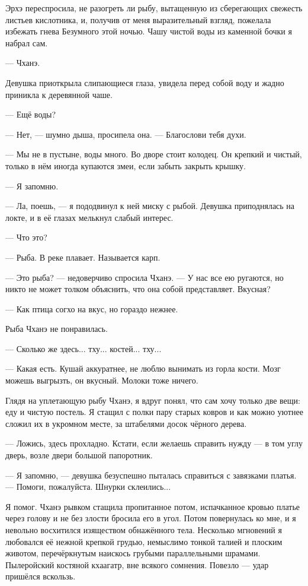 Эрхэ переспросила, не разогреть ли рыбу, вытащенную из сберегающих свежесть листьев кислотника, и, получив от меня выразительный взгляд, пожелала избежать гнева Безумного этой ночью.
Чашу чистой воды из каменной бочки я набрал сам.

--- Чханэ.

Девушка приоткрыла слипающиеся глаза, увидела перед собой воду и жадно приникла к деревянной чаше.

--- Ещё воды?

--- Нет, --- шумно дыша, просипела она.
--- Благослови тебя духи.

--- Мы не в пустыне, воды много.
Во дворе стоит колодец.
Он крепкий и чистый, только в нём иногда купаются змеи, если забыть закрыть крышку.

--- Я запомню.

--- Ла, поешь, --- я пододвинул к ней миску с рыбой.
Девушка приподнялась на локте, и в её глазах мелькнул слабый интерес.

--- Что это?

--- Рыба.
В реке плавает.
Называется карп.

--- Это рыба? --- недоверчиво спросила Чханэ.
--- У нас все ею ругаются, но никто не может толком объяснить, что она собой представляет.
Вкусная?

--- Как птица согхо на вкус, но гораздо нежнее.

Рыба Чханэ не понравилась.

--- Сколько же здесь... тху... костей... тху...

--- Какая есть.
Кушай аккуратнее, не люблю вынимать из горла кости.
Мозг можешь выгрызть, он вкусный.
Молоки тоже ничего.

Глядя на уплетающую рыбу Чханэ, я вдруг понял, что сам хочу только две вещи: еду и чистую постель.
Я стащил с полки пару старых ковров и как можно уютнее сложил их в укромном месте, за штабелями досок чёрного дерева.

--- Ложись, здесь прохладно.
Кстати, если желаешь справить нужду --- в том углу дверь, возле двери большой папоротник.

--- Я запомню, --- девушка безуспешно пыталась справиться с завязками платья.
--- Помоги, пожалуйста.
Шнурки склеились...

Я помог.
Чханэ рывком стащила пропитанное потом, испачканное кровью платье через голову и не без злости бросила его в угол.
Потом повернулась ко мне, и я невольно восхитился изяществом обнажённого тела.
Несколько мгновений я любовался её нежной крепкой грудью, немыслимо тонкой талией и плоским животом, перечёркнутым наискось грубыми параллельными шрамами.
Пылеройский костяной кхаагатр, вне всякого сомнения.
Повезло --- удар пришёлся вскользь.


